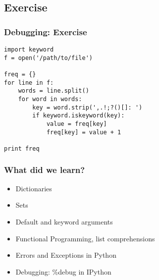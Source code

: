 \documentclass[14pt,compress]{beamer}
\newcounter{time}
\newcommand{\inctime}[1]{\addtocounter{time}{#1}{\tiny \thetime\ m}}
\begin{document}
\subsection{Exercise}
\begin{frame}[fragile]
\frametitle{Debugging: Exercise}
\small
\begin{lstlisting}
import keyword
f = open('/path/to/file')

freq = {}
for line in f:
    words = line.split()
    for word in words:
        key = word.strip(',.!;?()[]: ')
        if keyword.iskeyword(key):
            value = freq[key]
            freq[key] = value + 1

print freq
\end{lstlisting}
\inctime{10}
\end{frame}

\begin{frame}
  \frametitle{What did we learn?}
  \begin{itemize}
    \item Dictionaries
    \item Sets
    \item Default and keyword arguments
    \item Functional Programming, list comprehensions
    \item Errors and Exceptions in Python
    \item Debugging: \%debug in IPython
  \end{itemize}
\end{frame}
\end{document}
